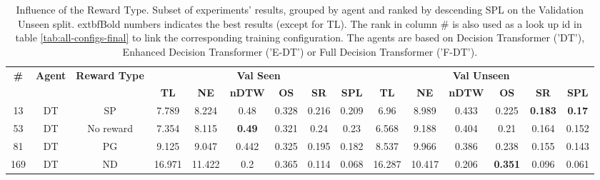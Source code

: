 \begin{table}
\centering
\caption{\label{tab:reward_type}Influence of the Reward Type. Subset of experiments' results, grouped by agent and ranked by descending SPL on the Validation Unseen split. 	extbf{Bold} numbers indicates the best results (except for TL). The rank in column \# is also used as a look up id in table \ref{tab:all-configs-final} to link the corresponding training configuration.     \newline The agents are based on Decision Transformer ('DT'), Enhanced Decision Transformer ('E-DT') or Full Decision Transformer ('F-DT').}
\begin{tabular}{@{\hskip3pt}c@{\hskip3pt}c@{\hskip3pt}c@{\hskip3pt}c@{\hskip3pt}c@{\hskip3pt}c@{\hskip3pt}c@{\hskip3pt}c@{\hskip3pt}c@{\hskip3pt}c@{\hskip3pt}c@{\hskip3pt}c@{\hskip3pt}c@{\hskip3pt}c@{\hskip3pt}c}
\toprule
\textbf{\#} & \textbf{Agent} & \textbf{Reward Type} & \multicolumn{6}{c}{\textbf{Val Seen}} & \multicolumn{6}{c}{\textbf{Val Unseen}} \\
 \textbf{~} &     \textbf{~} &           \textbf{~} &       \textbf{TL} &     \textbf{NE} &  \textbf{nDTW} &     \textbf{OS} &     \textbf{SR} &    \textbf{SPL} &         \textbf{TL} &   \textbf{NE} &   \textbf{nDTW} &     \textbf{OS} &     \textbf{SR} &   \textbf{SPL} \\
\midrule
         13 &             DT &                   SP &             7.789 &           8.224 &           0.48 &           0.328 &           0.216 &           0.209 &                6.96 &         8.989 &           0.433 &           0.225 &  \textbf{0.183} &  \textbf{0.17} \\
         53 &             DT &            No reward &             7.354 &           8.115 &  \textbf{0.49} &           0.321 &            0.24 &            0.23 &               6.568 &         9.188 &           0.404 &            0.21 &           0.164 &          0.152 \\
         81 &             DT &                   PG &             9.125 &           9.047 &          0.442 &           0.325 &           0.195 &           0.182 &               8.537 &         9.966 &           0.386 &           0.238 &           0.155 &          0.143 \\
        169 &             DT &                   ND &            16.971 &          11.422 &            0.2 &           0.365 &           0.114 &           0.068 &              16.287 &        10.417 &           0.206 &  \textbf{0.351} &           0.096 &          0.061 \\

\end{tabular}
\end{table}
